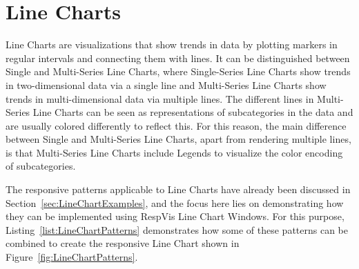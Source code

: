 \section{Line Charts}
\label{sec:LineChartsUsage}

Line Charts are visualizations that show trends in data by plotting
markers in regular intervals and connecting them with lines.  It can
be distinguished between Single and Multi-Series Line Charts, where
Single-Series Line Charts show trends in two-dimensional data via a
single line and Multi-Series Line Charts show trends in
multi-dimensional data via multiple lines.  The different lines in
Multi-Series Line Charts can be seen as representations of
subcategories in the data and are usually colored differently to
reflect this.  For this reason, the main difference between Single and
Multi-Series Line Charts, apart from rendering multiple lines, is that
Multi-Series Line Charts include Legends to visualize the color
encoding of subcategories.

The responsive patterns applicable to Line Charts have already been
discussed in Section~\ref{sec:LineChartExamples}, and the focus here
lies on demonstrating how they can be implemented using RespVis Line
Chart Windows.  For this purpose, Listing~\ref{list:LineChartPatterns}
demonstrates how some of these patterns can be combined to create the
responsive Line Chart shown in Figure~\ref{fig:LineChartPatterns}.

